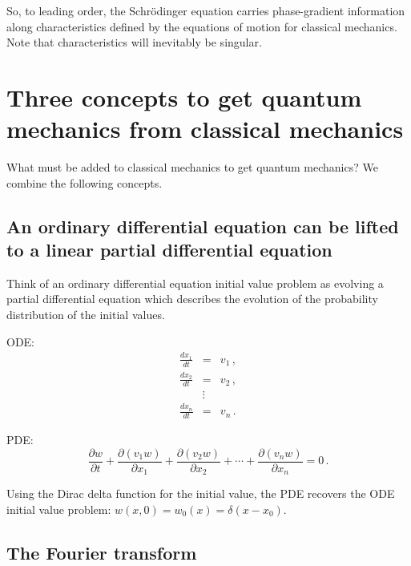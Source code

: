 \documentclass[prb,preprint]{revtex4-1}
\begin{document}
So, to leading order, the Schr\"odinger equation carries phase-gradient
information along characteristics defined by the equations of motion for classical mechanics.
Note that characteristics will inevitably be singular.


\section{Three concepts to get quantum mechanics from classical mechanics}

What must be added to classical mechanics to get quantum mechanics?  We combine the following concepts.

\subsection{An ordinary differential equation can be lifted to a linear partial differential equation}

Think of an ordinary differential equation initial value problem as evolving a
partial differential equation which describes the evolution of the probability
distribution of the initial values.\cite{goldstein2002}

ODE:
\begin{eqnarray}
\frac{dx_1}{dt} &=& v_1 \,, \\
\frac{dx_2}{dt} &=& v_2 \,, \\
&\vdots& \nonumber \\
\frac{dx_n}{dt} &=& v_n \,.
\end{eqnarray}

PDE:
\begin{equation}\label{eq:liouville}
\frac{\partial w}{\partial t}
+ \frac{\partial (v_1 w)}{\partial x_1}
+ \frac{\partial (v_2 w)}{\partial x_2}
+ \cdots
+ \frac{\partial (v_n w)}{\partial x_n}
= 0 \,.
\end{equation}

Using the Dirac delta function for the initial value, the PDE recovers the ODE initial value
problem: $w(x,0) = w_0(x) = \delta(x-x_0)$.

\subsection{The Fourier transform}
\end{document}
